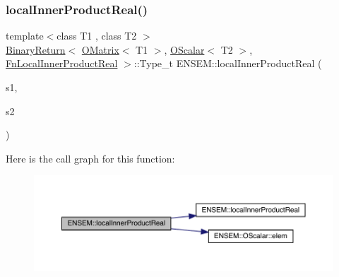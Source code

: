 \subsubsection{\texorpdfstring{localInnerProductReal()}{localInnerProductReal()}\hspace{0.1cm}{\footnotesize\ttfamily [2/3]}}
{\footnotesize\ttfamily template$<$class T1 , class T2 $>$ \\
\mbox{\hyperlink{structENSEM_1_1BinaryReturn}{Binary\+Return}}$<$ \mbox{\hyperlink{classENSEM_1_1OMatrix}{O\+Matrix}}$<$ T1 $>$, \mbox{\hyperlink{classENSEM_1_1OScalar}{O\+Scalar}}$<$ T2 $>$, \mbox{\hyperlink{structENSEM_1_1FnLocalInnerProductReal}{Fn\+Local\+Inner\+Product\+Real}} $>$\+::Type\+\_\+t E\+N\+S\+E\+M\+::local\+Inner\+Product\+Real (\begin{DoxyParamCaption}\item[{const \mbox{\hyperlink{classENSEM_1_1OMatrix}{O\+Matrix}}$<$ T1 $>$ \&}]{s1,  }\item[{const \mbox{\hyperlink{classENSEM_1_1OScalar}{O\+Scalar}}$<$ T2 $>$ \&}]{s2 }\end{DoxyParamCaption})\hspace{0.3cm}{\ttfamily [inline]}}

Here is the call graph for this function\+:\nopagebreak
\begin{figure}[H]
\begin{center}
\leavevmode
\includegraphics[width=350pt]{d8/d55/group__obsmatrix_ga3b363fa48471a9d3fc6da5cbfcb21fb5_cgraph}
\end{center}
\end{figure}
\mbox{\label{group__obsmatrix_gad83f3516610f8446eb55b7e511c807be}} 
